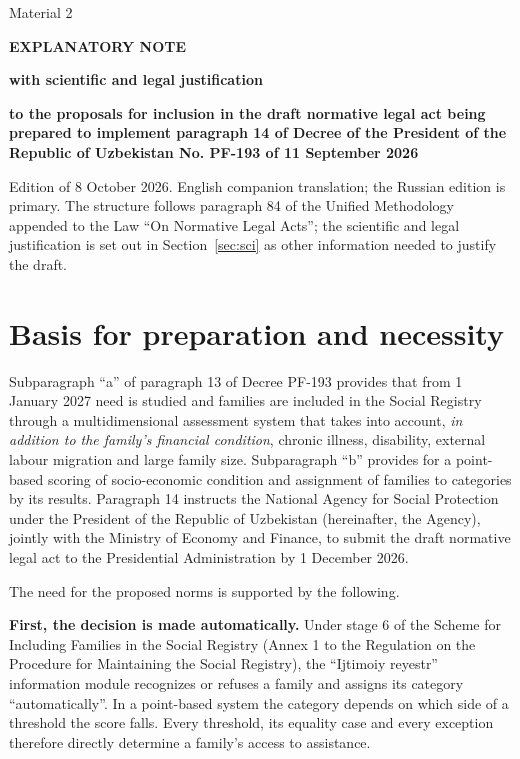 \documentclass[14pt,a4paper]{extarticle}
\begin{document}
\begin{flushright}Material 2\end{flushright}
\begin{center}\textbf{EXPLANATORY NOTE}\par
\textbf{with scientific and legal justification}\par
\textbf{to the proposals for inclusion in the draft normative legal act being prepared to implement paragraph 14 of Decree of the President of the Republic of Uzbekistan No. PF-193 of 11 September 2026}\end{center}

\noindent Edition of 8 October 2026. English companion translation; the Russian edition is primary. The structure follows paragraph 84 of the Unified Methodology appended to the Law “On Normative Legal Acts”; the scientific and legal justification is set out in Section~\ref{sec:sci} as other information needed to justify the draft.

\section{Basis for preparation and necessity}\label{sec:basis}
Subparagraph “a” of paragraph 13 of Decree PF-193 provides that from 1 January 2027 need is studied and families are included in the Social Registry through a multidimensional assessment system that takes into account, \textit{in addition to the family’s financial condition}, chronic illness, disability, external labour migration and large family size. Subparagraph “b” provides for a point-based scoring of socio-economic condition and assignment of families to categories by its results. Paragraph 14 instructs the National Agency for Social Protection under the President of the Republic of Uzbekistan (hereinafter, the Agency), jointly with the Ministry of Economy and Finance, to submit the draft normative legal act to the Presidential Administration by 1 December 2026\cite{pf193}.

The need for the proposed norms is supported by the following.

\textbf{First, the decision is made automatically.} Under stage 6 of the Scheme for Including Families in the Social Registry (Annex 1 to the Regulation on the Procedure for Maintaining the Social Registry), the “Ijtimoiy reyestr” information module recognizes or refuses a family and assigns its category “automatically”\cite{res35}. In a point-based system the category depends on which side of a threshold the score falls. Every threshold, its equality case and every exception therefore directly determine a family’s access to assistance.
\end{document}
